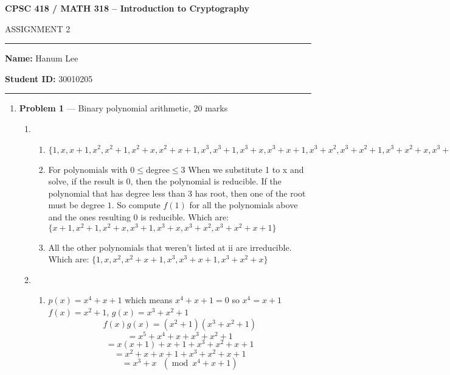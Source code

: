 \documentclass[11pt]{article}
\theoremstyle{definition}
\renewcommand{\pmod}[1]{\mbox{\ $(\ensuremath{\operatorname{mod}}\ {#1})$}}
\begin{document}
\begin{center}
{\bf \Large CPSC 418 / MATH 318 -- Introduction to Cryptography

ASSIGNMENT 2}
\end{center}

\hrule 	

\textbf{Name:} Hanum Lee

\textbf{Student ID:} 30010205

\medskip \hrule

\begin{enumerate}

	\item[] \textbf{Problem 1} ---  Binary polynomial arithmetic, 20 marks
	
	\begin{enumerate}
		\item %
		
		\begin{enumerate}
			\item %
			$\{1,x,x+1,x^{2},x^{2}+1,x^{2}+x,x^{2}+x+1,x^{3},x^{3}+1,x^{3}+x,x^{3}+x+1,x^{3}+x^{2},x^{3}+x^{2}+1,x^{3}+x^{2}+x,x^{3}+x^{2}+x+1 \}$
			
			\item %
			For polynomials with 0$\leq$degree$\leq$3 When we substitute 1 to x and solve, if the result is 0, then the polynomial is reducible. If the polynomial that has degree less than $3$ has root, then one of the root must be degree $1$. So compute $f(1)$ for all the polynomials above and the ones resulting 0 is reducible. Which are: \newline
			$\{x+1,x^{2}+1,x^{2}+x,x^{3}+1,x^{3}+x,x^{3}+x^{2},x^{3}+x^{2}+x+1\}$
			
			\item %
			All the other polynomials that weren't listed at ii are irreducible. Which are: \newline
			$\{1,x,x^{2},x^{2}+x+1,x^{3},x^{3}+x+1,x^{3}+x^{2}+x\}$
		
		\end{enumerate}
	
		\item %
			
		\begin{enumerate}
			\item %
			$p(x) = x^{4}+x+1$ which means $x^{4}+x+1 = 0$ so $x^4=x+1$\newline
			$f(x) = x^{2}+1$,  $g(x) = x^{3}+x^{2}+1$	\newline
			\[f(x)g(x) = (x^2+1)(x^{3}+x^{2}+1)\]
			\[= x^5 + x^4 + x + x^3 + x^2 + 1\]
			\[= x(x+1) + x+1 + x^3 + x^2 + x + 1\]
			\[= x^2 + x + x + 1 + x^3 + x^2 + x + 1\]
			\[=x^3+x \pmod{x^4+x+1} \]
			

\end{enumerate}
\end{enumerate}
\end{enumerate}
\end{document}
